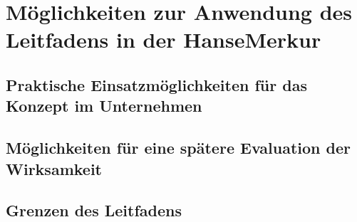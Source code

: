 \section{Möglichkeiten zur Anwendung des Leitfadens in der HanseMerkur}

\subsection{Praktische Einsatzmöglichkeiten für das Konzept im Unternehmen}

\subsection{Möglichkeiten für eine spätere Evaluation der Wirksamkeit}

\subsection{Grenzen des Leitfadens}
